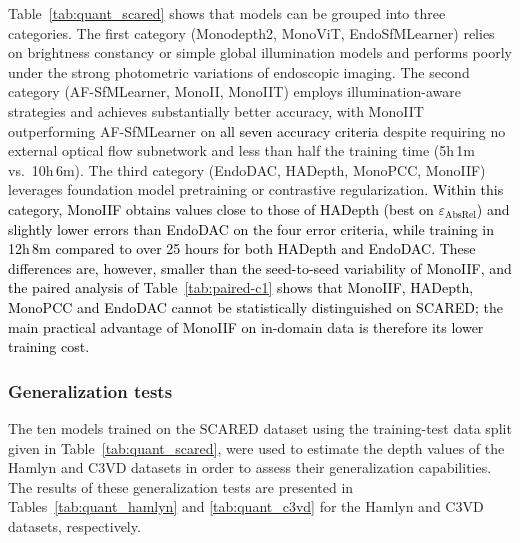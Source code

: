 \documentclass[a4paper,fleqn]{cas-dc}
\begin{document}
{%


Table~\ref{tab:quant_scared} shows that models can be grouped into three categories. The first category (Monodepth2, MonoViT, EndoSfMLearner) relies on brightness constancy or simple global illumination models and performs poorly under the strong photometric variations of endoscopic imaging. The second category (AF-SfMLearner, MonoII, MonoIIT) employs illumination-aware strategies and achieves substantially better accuracy, with MonoIIT outperforming AF-SfMLearner on \textcolor{black}{all seven accuracy criteria} despite requiring no external optical flow subnetwork and less than half the training time (5h\,1m vs.\ 10h\,6m). The third category (EndoDAC, HADepth, MonoPCC, MonoIIF) leverages foundation model pretraining or contrastive regularization. \textcolor{black}{ Within this category, MonoIIF obtains values close to those of HADepth (best on $\varepsilon_\text{AbsRel}$) and slightly lower errors than EndoDAC on the four error criteria, while training in 12h\,8m compared to over 25 hours for both HADepth and EndoDAC. These differences are, however, smaller than the seed-to-seed variability of MonoIIF, and the paired analysis of Table~\ref{tab:paired-c1} shows that MonoIIF, HADepth, MonoPCC and EndoDAC cannot be statistically distinguished on SCARED; the main practical advantage of MonoIIF on in-domain data is therefore its lower training cost.}

%
\subsubsection{Generalization tests}
%

The ten models trained on the SCARED dataset using the training-test data split given in  Table~\ref{tab:quant_scared}, were used to estimate the depth values of the Hamlyn and C3VD datasets in order to assess their generalization capabilities. The results of these generalization tests are presented in Tables~\ref{tab:quant_hamlyn} and \ref{tab:quant_c3vd} for the Hamlyn and C3VD datasets, respectively.


}
\end{document}
